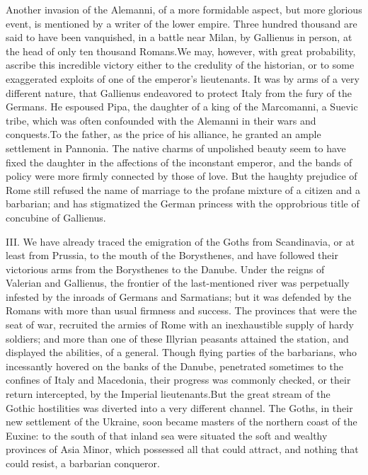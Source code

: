 
Another invasion of the Alemanni, of a more formidable aspect,
but more glorious event, is mentioned by a writer of the lower
empire. Three hundred thousand are said to have been vanquished,
in a battle near Milan, by Gallienus in person, at the head of
only ten thousand Romans.\footnotemark[91] We may, however, with great
probability, ascribe this incredible victory either to the
credulity of the historian, or to some exaggerated exploits of
one of the emperor’s lieutenants. It was by arms of a very
different nature, that Gallienus endeavored to protect Italy from
the fury of the Germans. He espoused Pipa, the daughter of a king
of the Marcomanni, a Suevic tribe, which was often confounded
with the Alemanni in their wars and conquests.\footnotemark[92] To the father,
as the price of his alliance, he granted an ample settlement in
Pannonia. The native charms of unpolished beauty seem to have
fixed the daughter in the affections of the inconstant emperor,
and the bands of policy were more firmly connected by those of
love. But the haughty prejudice of Rome still refused the name of
marriage to the profane mixture of a citizen and a barbarian; and
has stigmatized the German princess with the opprobrious title of
concubine of Gallienus.\footnotemark[93]




III. We have already traced the emigration of the Goths from
Scandinavia, or at least from Prussia, to the mouth of the
Borysthenes, and have followed their victorious arms from the
Borysthenes to the Danube. Under the reigns of Valerian and
Gallienus, the frontier of the last-mentioned river was
perpetually infested by the inroads of Germans and Sarmatians;
but it was defended by the Romans with more than usual firmness
and success. The provinces that were the seat of war, recruited
the armies of Rome with an inexhaustible supply of hardy
soldiers; and more than one of these Illyrian peasants attained
the station, and displayed the abilities, of a general. Though
flying parties of the barbarians, who incessantly hovered on the
banks of the Danube, penetrated sometimes to the confines of
Italy and Macedonia, their progress was commonly checked, or
their return intercepted, by the Imperial lieutenants.\footnotemark[94] But the
great stream of the Gothic hostilities was diverted into a very
different channel. The Goths, in their new settlement of the
Ukraine, soon became masters of the northern coast of the Euxine:
to the south of that inland sea were situated the soft and
wealthy provinces of Asia Minor, which possessed all that could
attract, and nothing that could resist, a barbarian conqueror.

